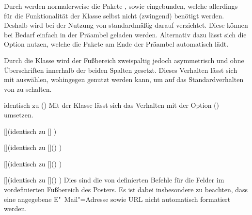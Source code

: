 \begin{Entity*}{}
\begin{Declaration}{}
\printdeclarationlist%
%
Durch  werden normalerweise die Pakete , 
 sowie  eingebunden, welche allerdings für 
die Funktionalität der Klasse selbst nicht (zwingend) benötigt werden. Deshalb 
wird bei der Nutzung von  standardmäßig darauf verzichtet. 
Diese können bei Bedarf einfach in der Präambel geladen werden. Alternativ 
dazu 
lässt sich die Option  nutzen, welche die Pakete am Ende 
der Präambel automatisch lädt.
\end{Declaration}

\begin{Declaration}{}%
\printdeclarationlist%
%
Durch die Klasse  wird der Fußbereich zweispaltig jedoch 
asymmetrisch und ohne Überschriften innerhalb der beiden Spalten gesetzt. 
Dieses Verhalten lässt sich mit  auswählen, wohingegen 
 genutzt werden kann, um auf das Standardverhalten 
von  zu schalten.
\end{Declaration}

\begin{Declaration}{}{%
  identisch zu ()%
}
\printdeclarationlist%
%
Mit der Klasse  lässt sich das Verhalten mit der Option 
() umsetzen.
\end{Declaration}

\begin{Declaration}{[]}(identisch zu 
  []%
)
\begin{Declaration}{[]}(identisch zu 
  []()%
)
\begin{Declaration}{[]}(identisch zu 
  []()%
)
\begin{Declaration}{[]}(identisch zu 
  []()%
)
\printdeclarationlist%
%
Dies sind die von  definierten Befehle für die Felder im 
vordefinierten Fußbereich des Posters. Es ist dabei insbesondere zu beachten, 
dass eine angegebene E"~Mail"=Adresse sowie URL nicht automatisch formatiert 
werden.
\end{Declaration}
\end{Declaration}
\end{Declaration}
\end{Declaration}


\end{Entity*}
